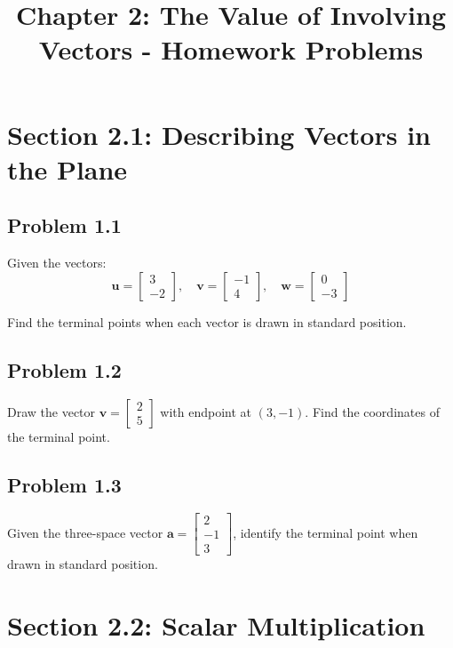 \documentclass{article}
\title{Chapter 2: The Value of Involving Vectors - Homework Problems}
\author{}
\date{}
\begin{document}
\maketitle

\section{Section 2.1: Describing Vectors in the Plane}

\subsection{Problem 1.1}
Given the vectors:
$$\mathbf{u} = \begin{bmatrix} 3 \\ -2 \end{bmatrix}, \quad \mathbf{v} = \begin{bmatrix} -1 \\ 4 \end{bmatrix}, \quad \mathbf{w} = \begin{bmatrix} 0 \\ -3 \end{bmatrix}$$

Find the terminal points when each vector is drawn in standard position.

\subsection{Problem 1.2}
Draw the vector $\mathbf{v} = \begin{bmatrix} 2 \\ 5 \end{bmatrix}$ with endpoint at $(3, -1)$. Find the coordinates of the terminal point.

\subsection{Problem 1.3}
Given the three-space vector $\mathbf{a} = \begin{bmatrix} 2 \\ -1 \\ 3 \end{bmatrix}$, identify the terminal point when drawn in standard position.

\section{Section 2.2: Scalar Multiplication}
\end{document}
